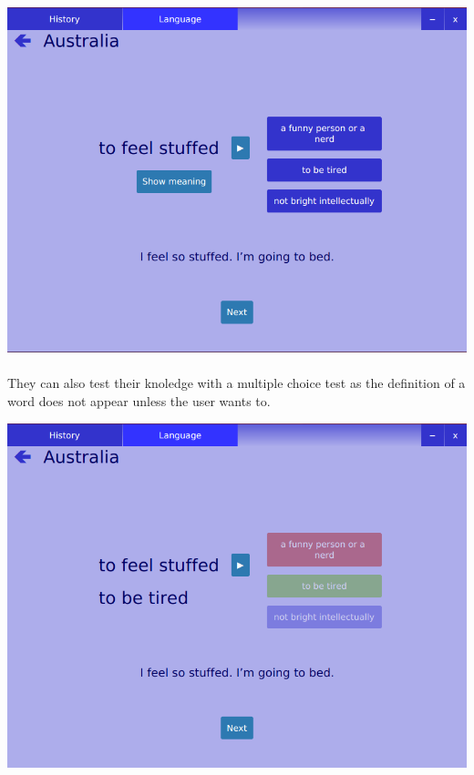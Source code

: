 \documentclass[11pt, a4paper]{report}
\begin{document}
\vspace{0.2cm}
\centerline{\includegraphics[scale=0.5]{images/AustraliaQuestion.png}}
\vspace{-0.35cm}

\paragraph{}They can also test their knoledge with a multiple choice test as the definition of a word does not appear unless the user wants to.

\vspace{0.08cm}
\centerline{\includegraphics[scale=0.5]{images/AustraliaWrongAnswer.png}}
\end{document}
